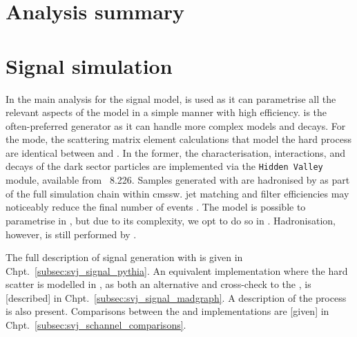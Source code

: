 



\section{Analysis summary}
\label{sec:svj_overview}




\section{Signal simulation}
\label{sec:signal_sim}

In the main analysis for the \schannel signal model, \PYTHIA is used as it can parametrise all the relevant aspects of the model in a simple manner with high efficiency. \MADGRAPH is the often-preferred generator as it can handle more complex models and decays. For the \schannel mode, the scattering matrix element calculations that model the hard process are identical between \PYTHIA and \MADGRAPH. In the former, the characterisation, interactions, and decays of the dark sector particles are implemented via the \texttt{Hidden Valley} module, available from \PYTHIA~8.226. Samples generated with \MADGRAPH are hadronised by \PYTHIA as part of the full simulation chain within \acrshort{cmssw}. \Gls{jet} matching and filter efficiencies may noticeably reduce the final number of events . The \tchannel model is possible to parametrise in \PYTHIA, but due to its complexity, we opt to do so in \MADGRAPH. Hadronisation, however, is still performed by \PYTHIA. %

The full description of \schannel signal generation with \PYTHIAEIGHT is given in Chpt.~\ref{subsec:svj_signal_pythia}. An equivalent implementation where the hard scatter is modelled in \MGvATNLO, as both an alternative and cross-check to the \PYTHIA [version], is [described] in Chpt.~\ref{subsec:svj_signal_madgraph}. A description of the \tchannel process is also present. Comparisons between the \PYTHIA and \MADGRAPH implementations are [given] in Chpt.~\ref{subsec:svj_schannel_comparisons}.


